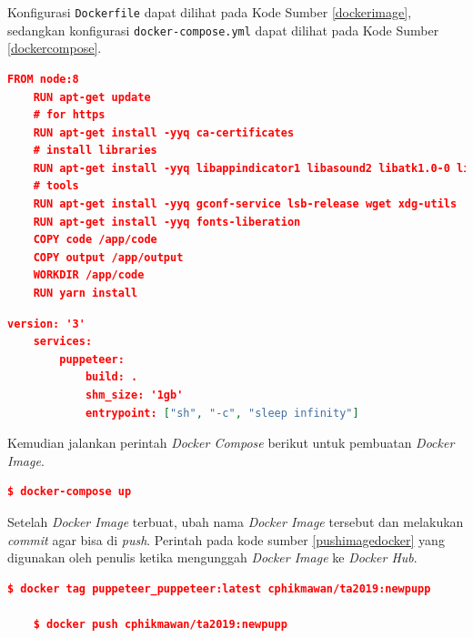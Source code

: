 			\indent Konfigurasi \texttt{Dockerfile} dapat dilihat pada Kode Sumber \ref{dockerimage}, sedangkan konfigurasi \texttt{docker-compose.yml} dapat dilihat pada Kode Sumber \ref{dockercompose}.
				\begin{lstlisting}[frame=single,tabsize=2,breaklines,caption={Konfigurasi \textit{Dockerfile} },label=dockerimage, captionpos=b, language=json]
	FROM node:8
	RUN apt-get update
	# for https
	RUN apt-get install -yyq ca-certificates
	# install libraries
	RUN apt-get install -yyq libappindicator1 libasound2 libatk1.0-0 libc6 libcairo2 libcups2 libdbus-1-3 libexpat1 libfontconfig1 libgcc1 libgconf-2-4 libgdk-pixbuf2.0-0 libglib2.0-0 libgtk-3-0 libnspr4 libnss3 libpango-1.0-0 libpangocairo-1.0-0 libstdc++6 libx11-6 libx11-xcb1 libxcb1 libxcomposite1 libxcursor1 libxdamage1 libxext6 libxfixes3 libxi6 libxrandr2 libxrender1 libxss1 libxtst6
	# tools
	RUN apt-get install -yyq gconf-service lsb-release wget xdg-utils
	RUN apt-get install -yyq fonts-liberation 
	COPY code /app/code
	COPY output /app/output
	WORKDIR /app/code
	RUN yarn install
				\end{lstlisting}
				
				\begin{lstlisting}[frame=single,tabsize=2,breaklines,caption={Konfigurasi \textit{docker-compose.yml} },label=dockercompose, captionpos=b, language=json]
	version: '3'
	services:
		puppeteer:
			build: .
			shm_size: '1gb'
			entrypoint: ["sh", "-c", "sleep infinity"]
				\end{lstlisting}
				
				Kemudian jalankan perintah \textit{Docker Compose} berikut untuk pembuatan \textit{Docker Image}.
				\begin{lstlisting}[frame=single,tabsize=2,breaklines,caption={Perintah untuk menjalankan  \textit{Docker Compose}},label=createimg, captionpos=b, language=json,numbers=none]
	$ docker-compose up
				\end{lstlisting}
				
				Setelah \textit{Docker Image} terbuat, ubah nama \textit{Docker Image} tersebut dan melakukan \textit{commit} agar bisa di \textit{push}. Perintah pada kode sumber \ref{pushimagedocker} yang digunakan oleh penulis ketika mengunggah \textit{Docker Image} ke \textit{Docker Hub}.
				\begin{lstlisting}[frame=single,tabsize=2,breaklines,caption={Perintah untuk mengunggah \textit{Docker Image}},label=pushimagedocker, captionpos=b, language=json,numbers=none]
	$ docker tag puppeteer_puppeteer:latest cphikmawan/ta2019:newpupp
	
	$ docker push cphikmawan/ta2019:newpupp
				\end{lstlisting}
				
